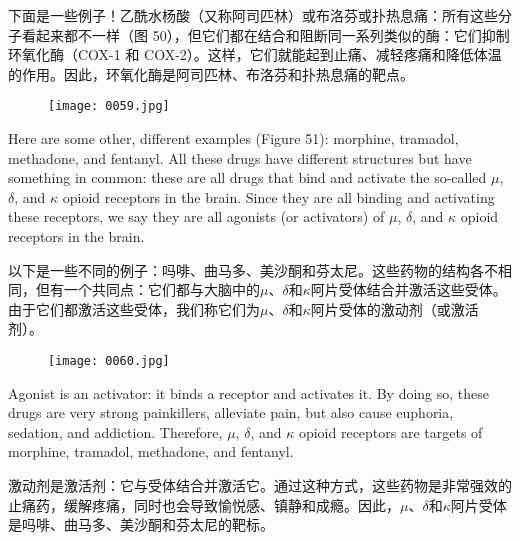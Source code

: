 \documentclass[dvipsnames, svgnames,a4paper,11pt]{article}
\begin{document}
下面是一些例子！乙酰水杨酸（又称阿司匹林）或布洛芬或扑热息痛：所有这些分子看起来都不一样（图 50），但它们都在结合和阻断同一系列类似的酶：它们抑制环氧化酶（COX-1 和 COX-2）。这样，它们就能起到止痛、减轻疼痛和降低体温的作用。因此，环氧化酶是阿司匹林、布洛芬和扑热息痛的靶点。

\begin{figure}[ht]
    \centering
    \texttt{[image: 0059.jpg]}
     \label{fig50}
\end{figure}
Here are some other, different examples (Figure 51): morphine, tramadol, methadone, and fentanyl. All these drugs have different structures but have something in common: these are all drugs that bind and activate the so-called $\mu$, $\delta$, and $\kappa$ opioid receptors in the brain. Since they are all binding and activating these receptors, we say they are all agonists (or activators) of $\mu$, $\delta$, and $\kappa$ opioid receptors in the brain.  

以下是一些不同的例子：吗啡、曲马多、美沙酮和芬太尼。这些药物的结构各不相同，但有一个共同点：它们都与大脑中的$\mu$、$\delta$和$\kappa$阿片受体结合并激活这些受体。由于它们都激活这些受体，我们称它们为$\mu$、$\delta$和$\kappa$阿片受体的激动剂（或激活剂）。

\begin{figure}[ht]
    \centering
    \texttt{[image: 0060.jpg]}
     \label{fig51}
\end{figure}

Agonist is an activator: it binds a receptor and activates it. By doing so, these drugs are very strong painkillers, alleviate pain, but also cause euphoria, sedation, and addiction. Therefore, $\mu$, $\delta$, and $\kappa$ opioid receptors are targets of morphine, tramadol, methadone, and fentanyl.  

激动剂是激活剂：它与受体结合并激活它。通过这种方式，这些药物是非常强效的止痛药，缓解疼痛，同时也会导致愉悦感、镇静和成瘾。因此，$\mu$、$\delta$和$\kappa$阿片受体是吗啡、曲马多、美沙酮和芬太尼的靶标。
\end{document}
